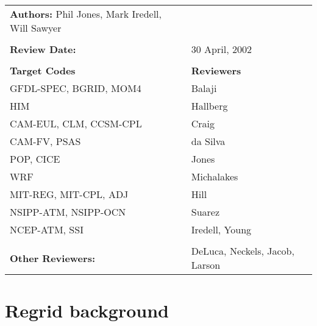 \begin{tabular}{l l}

{\bf Authors:} Phil Jones, Mark Iredell, Will Sawyer \\ \\

{\bf Review Date:}            & 30 April, 2002 \\ \\

{\bf Target Codes}            & {\bf Reviewers} \\
GFDL-SPEC, BGRID, MOM4        & Balaji \\
HIM                           & Hallberg \\
CAM-EUL, CLM, CCSM-CPL        & Craig \\
CAM-FV, PSAS                  & da Silva\\
POP, CICE                     & Jones \\
WRF                           & Michalakes \\
MIT-REG, MIT-CPL, ADJ         & Hill \\
NSIPP-ATM, NSIPP-OCN          & Suarez \\
NCEP-ATM, SSI                 & Iredell, Young \\ \\

{\bf Other Reviewers:}        & DeLuca, Neckels, Jacob, Larson

\end{tabular}


%

\section{Regrid background}


%

%

